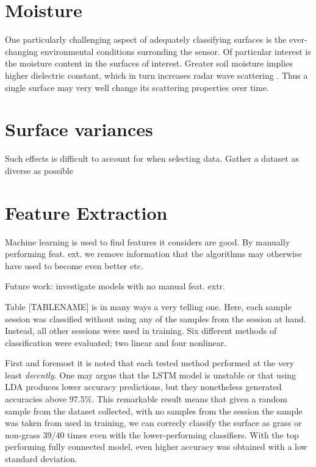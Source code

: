 \section{Moisture}

One particularly challenging aspect of adequately classifying surfaces is the ever-changing environmental conditions surronding the sensor. Of particular interest is the moisture content in the surfaces of interest. Greater soil moisture implies higher dielectric constant, which in turn increases radar wave scattering \citep{rappaport_2006}. Thus a single surface may very well change its scattering properties over time. 


\section{Surface variances}

Such effects is difficult to account for when selecting data. Gather a dataset as diverse as possible

\section{Feature Extraction}
 Machine learning is used to find features it considers are good. By manually performing feat. ext. we remove information that the algorithms may otherwise have used to become even better etc. 

Future work: investigate models with no manual feat. extr.

Table [TABLENAME] is in many ways a very telling one. Here, each sample session was classified without using any of the samples from the session at hand. Instead, all other sessions were used in training. Six different methods of classification were evaluated; two linear and four nonlinear. 

First and foremost it is noted that each tested method performed at the very least \emph{decently}. One may argue that the LSTM model is unstable or that using LDA produces lower accuracy predictions, but they nonetheless generated accuracies above 97.5\%. This remarkable result means that given a random sample from the dataset collected, with no samples from the session the sample was taken from used in training, we can correcly classify the surface as grass or non-grass 39/40 times even with the lower-performing classifiers. With the top performing fully connected model, even higher accuracy was obtained with a low standard deviation. 


